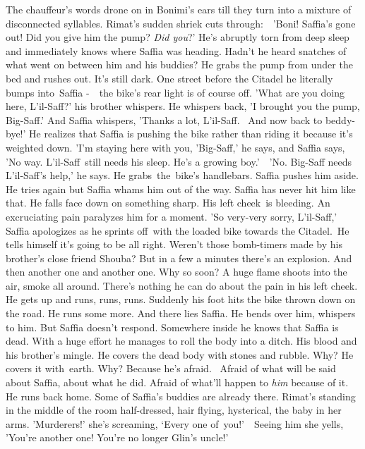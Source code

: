\documentclass[twoside,11pt]{book}
\begin{document}
The chauffeur's words drone on in Bonimi's ears till they turn into a mixture of disconnected syllables. Rimat's sudden
shriek cuts through:\ \ {}'Boni! Saffia's gone out! Did you give him the pump? \textit{Did you}?' He's abruptly torn
from deep sleep and immediately knows where Saffia was heading. Hadn't he heard snatches of what went on between him
and his buddies? He grabs the pump from under the bed and rushes out. It's still dark. One street before the Citadel he
literally bumps into~Saffia -\ \ the bike's rear light is of course off. 'What are you doing here, L'il-Saff?' his
brother whispers. He whispers back, 'I brought you the pump, Big-Saff.' And Saffia whispers, 'Thanks a lot, L'il-Saff.
~And now back to beddy-bye!{}'  He realizes that Saffia is pushing the bike rather than riding it because it's weighted
down. 'I'm staying here with you, 'Big-Saff,' he says, and Saffia says, 'No way. L'il-Saff~still needs his sleep. He's
a growing boy.'\ \ {}'No. Big-Saff needs L'il-Saff's help,' he says. He grabs~the~bike's handlebars. Saffia pushes him
aside. He tries again but Saffia whams him out of the way. Saffia has never hit him like that. He falls face down on
something sharp. His left cheek{\ }is bleeding. An excruciating pain paralyzes him for a moment. 'So
very{}-very sorry, L'il-Saff,' Saffia apologizes as he sprints off~with the loaded bike towards the Citadel.\ He tells
himself it's going to be all right. Weren't those bomb-timers made by his brother's close friend Shouba? But in a few a
minutes there's an explosion. And then another one and another one. Why so soon? A huge flame shoots into the air,
smoke all around. There's nothing he can do about the pain in his left cheek. He gets up and runs, runs, runs. Suddenly
his foot hits the bike thrown down on the road. He runs some more. And there lies Saffia. He bends over him, whispers
to him. But Saffia doesn't respond. Somewhere inside he knows that Saffia is dead. With a huge effort he manages to
roll the body into a ditch. His blood and his brother's mingle{. }He covers the dead body with stones
and rubble. Why? He covers it with\ earth. Why? Because he's afraid. ~Afraid of what will be said about Saffia, about
what he did. Afraid of what'll happen to \textit{him} because of it. He runs back home. Some of Saffia's buddies are
already there. Rimat's standing in the middle of the room half-dressed, hair flying, hysterical, the baby in her arms.
{}'Murderers!{}' she{}'s screaming, `Every one of~you!'\ \ Seeing him she yells, {}'You're another one! You're no
longer Glin's uncle!'
\end{document}
